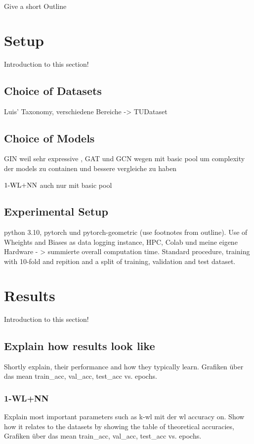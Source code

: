 Give a short Outline

\section{Setup}
Introduction to this section!

\subsection{Choice of Datasets}
Luis' Taxonomy, verschiedene Bereiche -> TUDataset

\subsection{Choice of Models}
GIN weil sehr expressive \cite{Xu2018}, GAT und GCN wegen \cite{Nikolentzos2023} mit basic pool um complexity der models zu containen und bessere vergleiche zu haben

$\text{1-WL+NN}$ auch nur mit basic pool

\subsection{Experimental Setup}
python 3.10, pytorch und pytorch-geometric (use footnotes from outline). Use of Wheights and Biases as data logging instance, HPC, Colab und meine eigene Hardware - > summierte overall computation time. Standard procedure, training with 10-fold and repition and a split of training, validation and test dataset.

\section{Results}
Introduction to this section!

\subsection{Explain how results look like}
Shortly explain, their performance and how they typically learn. Grafiken über das mean train\_acc, val\_acc, test\_acc vs. epochs.

\subsubsection{1-WL+NN}
Explain most important parameters such as k-wl mit der wl accuracy on. Show how it relates to the datasets by showing the table of theoretical accuracies, 
Grafiken über das mean train\_acc, val\_acc, test\_acc vs. epochs.

